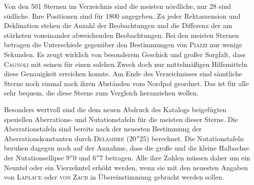 Von den 501 Sternen im Verzeichnis sind die meisten nördliche, nur 28 sind südliche. Ihre Positionen sind für 1800 angegeben. Zu jeder Rektaszension und Deklination stehen die Anzahl der Beobachtungen und die Differenz der am stärksten voneinander abweichenden Beobachtungen. Bei den meisten Sternen betragen die Unterschiede gegenüber den Bestimmungen von \textsc{Piazzi} nur wenige Sekunden. Es zeugt wirklich von besonderem Geschick und großer Sorgfalt, dass \textsc{Cagnoli} mit seinen für einen solchen Zweck doch nur mittelmäßigen Hilfsmitteln diese Genauigkeit erreichen konnte. Am Ende des Verzeichnisses sind sämtliche Sterne noch einmal nach ihren Abständen vom Nordpol geordnet. Das ist für alle sehr bequem, die diese Sterne zum Vergleich heranziehen wollen.

Besonders wertvoll sind die dem neuen Abdruck des Katalogs beigefügten speziellen Aberrations- und Nutationstafeln für die meisten dieser Sterne. Die Aberrationstafeln sind bereits nach der neuesten Bestimmung der Aberrationskonstanten durch \textsc{Delambre} ($20''25$) berechnet. Die Nutationstafeln beruhen dagegen noch auf der Annahme, dass die große und die kleine Halbachse der Nutationsellipse $9''0$ und $6''7$ betragen. Alle ihre Zahlen müssen daher um ein Neuntel oder ein Vierzehntel erhöht werden, wenn sie mit den neuesten Angaben von \textsc{Laplace} oder \textsc{von Zach} in Übereinstimmung gebracht werden sollen.
